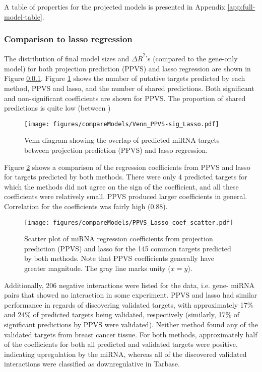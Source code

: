 A table of properties for the projected models is presented in Appendix
\ref{app:full-model-table}.


\subsubsection{Comparison to lasso regression}

The distribution of final model sizes and $\Delta\bar{R}^2$'s
(compared to the gene-only model) for both projection prediction (PPVS)
and lasso regression are shown in Figure \ref{}.
Figure \ref{fig:venn-ppvs-lasso} shows the number of putative targets
predicted by each method, PPVS and lasso,
and the number of shared predictions. Both significant and non-significant
coefficients are shown for PPVS. The proportion of shared predictions is
quite low (between )

\begin{figure}[htb]
  \centering
  \texttt{[image: figures/compareModels/Venn\_PPVS-sig\_Lasso.pdf]}
  \caption{Venn diagram showing the overlap of predicted miRNA targets
  between projection prediction (PPVS) and lasso regression.}
  \label{fig:venn-ppvs-lasso}
\end{figure}

Figure \ref{fig:scatter-ppvs-lasso} shows a comparison of the regression
coefficients from PPVS and lasso for targets predicted by both methods. There
were only 4 predicted targets for which the methods did not agree on the sign
of the coefficient, and all these coefficients were relatively small. PPVS
produced larger coefficients in general. Correlation for the coefficients was
fairly high ($0.88$).

\begin{figure}[htb]
  \centering
  \texttt{[image: figures/compareModels/PPVS\_Lasso\_coef\_scatter.pdf]}
  \caption{Scatter plot of miRNA regression coefficients from projection
  prediction (PPVS) and lasso for the 145 common targets predicted by both methods.
  Note that PPVS coefficients generally have greater magnitude. The gray
  line marks unity ($x=y$).}
  \label{fig:scatter-ppvs-lasso}
\end{figure}

Additionally, 206 negative interactions were listed for the data, i.e. gene-
miRNA pairs that showed no interaction in some experiment. PPVS and lasso had
similar performance in regards of discovering validated targets, with
approximately 17\% and 24\% of predicted targets being validated, respectively
(similarly, 17\% of significant predictions by PPVS were validated). Neither
method found any of the validated targets from breast cancer tissue. For both
methods, approximately half of the coefficients for both all predicted and
validated targets were positive, indicating upregulation by the miRNA, whereas
all of the discovered validated interactions were classified as downregulative
in Tarbase.
